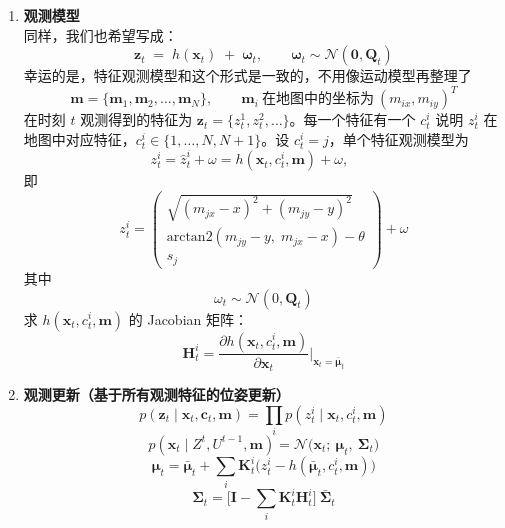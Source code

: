 \documentclass[../main.tex]{subfiles}
\begin{document}
\begin{enumerate}
{{\begin{enumerate}
    
    \item \textbf{观测模型}\\
    同样，我们也希望写成：
    $$
    \mathbf{z}_t \;=\; h(\mathbf{x}_t) \;+\; \boldsymbol{\omega}_t,\qquad \boldsymbol{\omega}_t\sim\mathcal{N}(\mathbf{0},\mathbf{Q}_t)
    $$
    幸运的是，特征观测模型和这个形式是一致的，不用像运动模型再整理了
    $$
    \mathbf{m}=\{ \mathbf{m}_1,\mathbf{m}_2,\ldots,\mathbf{m}_N\},\qquad
    \mathbf{m}_i\ \text{在地图中的坐标为}\ (m_{ix},m_{iy})^T
    $$
    在时刻 $t$ 观测得到的特征为 $ \mathbf{z}_t = \{ z_t^1,z_t^2,\ldots\}$。每一个特征有一个 $c_t^i$ 说明 $z_t^i$ 在地图中对应特征，$c_t^i\in\{1,\ldots,N,N+1\}$。设 $c_t^i=j$，单个特征观测模型为
    $$
    z_t^i =
    \hat{z}_t^i  + \omega= h(\mathbf{x}_t, c_t^i, \mathbf{m})
    + \omega,\qquad
    $$
    即
    $$
    z_t^i =
    \begin{pmatrix}
      \sqrt{(m_{jx}-x)^2 + (m_{jy}-y)^2} \\[6pt]
      \mathrm{arctan2}(m_{jy}-y,\; m_{jx}-x) - \theta \\[6pt]
      s_j
    \end{pmatrix}
    + \omega
    $$
    其中
    $$\omega_t \sim \mathcal{N}(0,\mathbf{Q}_t)$$
    求 $h(\mathbf{x}_t, c_t^i, \mathbf{m})$ 的 Jacobian 矩阵：
    $$
    \mathbf{H}_t^i = \frac{\partial h(\mathbf{x}_t, c_t^i, \mathbf{m})}{\partial \mathbf{x}_t}\bigg|_{\mathbf{x}_t=\bar{\boldsymbol{\mu}}_t}
    $$
    
    \item \textbf{观测更新（基于所有观测特征的位姿更新）}
    $$
    p(\mathbf{z}_t \mid \mathbf{x}_t, \mathbf{c}_t, \mathbf{m}) = \prod_i p(z_t^i \mid \mathbf{x}_t, c_t^i, \mathbf{m})
    $$
    $$
    p(\mathbf{x}_t \mid Z^t, U^{t-1}, \mathbf{m}) = \mathcal{N}\big(\mathbf{x}_t;\ \boldsymbol{\mu}_t,\ \boldsymbol{\Sigma}_t\big)
    $$
    $$
    \boldsymbol{\mu}_t = \bar{\boldsymbol{\mu}}_t + \sum_i \mathbf{K}_t^i\big(z_t^i - h(\bar{\boldsymbol{\mu}}_t, c_t^i, \mathbf{m})\big)
    $$
    $$
    \boldsymbol{\Sigma}_t = \big[\mathbf{I} - \sum_i \mathbf{K}_t^i \mathbf{H}_t^i\big]\ \bar{\boldsymbol{\Sigma}}_t
    $$
    

\end{enumerate}}}
\end{enumerate}
\end{document}
